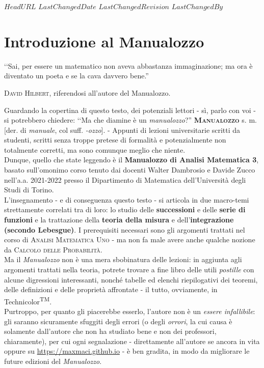 \svnidlong
{$HeadURL$}
{$LastChangedDate$}
{$LastChangedRevision$}
{$LastChangedBy$}

\chapter*{Introduzione al Manualozzo}

\begin{introduction}
‘‘Sai, per essere un matematico non aveva abbastanza immaginazione; ma ora è diventato un poeta e se la cava davvero bene.''
\begin{flushright}
	\textsc{David Hilbert,} riferendosi  all'autore del Manualozzo.
\end{flushright}
\end{introduction}

\noindent Guardando la copertina di questo testo, dei potenziali lettori - sì, parlo con voi - si potrebbero chiedere: ‘‘Ma che diamine è un \textit{manualozzo}?''
\vspace{3mm}
\lettrine[findent=1pt, nindent=0pt]{\textbf{M}}{\textbf{anualozzo}} s. m. [der. di \textit{manuale}, col suff. \textit{-ozzo}]. - Appunti di lezioni universitarie scritti da studenti, scritti senza troppe pretese di formalità e potenzialmente non totalmente corretti, ma sono comunque meglio che niente.
\vspace{3mm}\\
Dunque, quello che state leggendo è il \textbf{Manualozzo di Analisi Matematica 3}, basato sull'omonimo corso tenuto dai docenti Walter Dambrosio e Davide Zucco nell'a.a. 2021-2022 presso il Dipartimento di Matematica dell'Università degli Studi di Torino.\\
L'insegnamento - e di conseguenza questo testo - si articola in due macro-temi strettamente correlati tra di loro: lo studio delle \textbf{successioni} e delle \textbf{serie di funzioni} e la trattazione della \textbf{teoria della misura} e dell'\textbf{integrazione (secondo Lebesgue)}. I prerequisiti necessari sono gli argomenti trattati nel corso di \textsc{Analisi Matematica Uno} - ma non fa male avere anche qualche nozione da \textsc{Calcolo delle Probabilità}.\\
Ma il \textit{Manualozzo} non è una mera sbobinatura delle lezioni: in aggiunta agli argomenti trattati nella teoria, potrete trovare a fine libro delle utili \textit{postille} con alcune digressioni interessanti, nonché tabelle ed elenchi riepilogativi dei teoremi, delle definizioni e delle proprietà affrontate - il tutto, ovviamente, in Technicolor\textsuperscript{TM}.\\
Purtroppo, per quanto gli piacerebbe esserlo, l'autore non è un \textit{essere infallibile}: gli saranno sicuramente sfuggiti degli errori (o degli \textit{orrori}, la cui causa è solamente dall'autore che non ha studiato bene e non dei professori, chiaramente), per cui ogni segnalazione - direttamente all'autore se ancora in vita oppure su \textcolor{redill}{\url{https://maxmaci.github.io}} - è ben gradita, in modo da migliorare le future edizioni del \textit{Manualozzo}.\\

